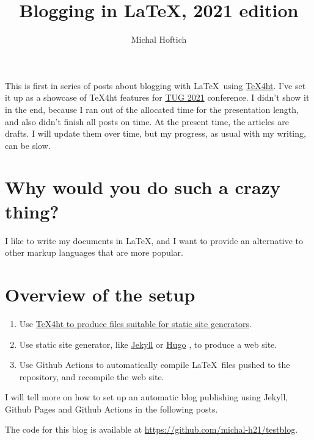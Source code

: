 \documentclass{article}
\title{Blogging in LaTeX, 2021 edition}
\author{Michal Hoftich}
\begin{document}
\maketitle


\tableofcontents

This is first in series of posts about blogging with \LaTeX\ using
\href{https://tug.org/tex4ht/}{\TeX4ht}. I've set it up as a showcase of
\TeX4ht features for \href{https://tug.org/tug2021/}{TUG 2021} conference.
I didn't show it in the end, because I ran out of the allocated time 
for the presentation length, and also didn't finish all posts on time. 
At the present time, the articles are drafts. I will update them over time,
but my progress, as usual with my writing, can be slow.

\section*{Why would you do such a crazy thing?}

I like to write my documents in \LaTeX, and I want to provide an alternative
to other markup languages that are more popular. 



\section*{Overview of the setup}

\begin{enumerate}
\item Use \href{/testblog/2021/07/30/how-to-blog-with-tex4ht.html}
{\TeX4ht to produce files suitable for static site generators}.
\item Use static site generator, like \href{https://jekyllrb.com/}{Jekyll}
or \href{https://gohugo.io/}{Hugo}
, to produce a web site.
\item Use Github Actions to automatically compile \LaTeX\ files pushed
to the repository, and recompile the web site. 
\end{enumerate}

I will tell more on how to set up an automatic
blog publishing using Jekyll, Github Pages and Github Actions in the following posts.

The code for this blog is available at
\url{https://github.com/michal-h21/testblog}.
\end{document}
